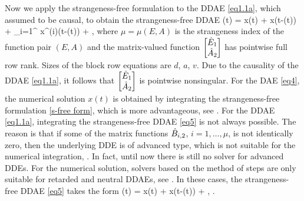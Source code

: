 \documentclass[final,reqno]{siamltex}
\begin{document}
Now we apply the strangeness-free formulation to the DDAE \eqref{eq1.1a}, which assumed to be causal, to obtain the strangeness-free DDAE
%
\be\label{eq5}
  (t) \!=\!  x(t) \!+\!
  x(t-\vtau(t))
 \!+\!  \sum_{i=1}^{\mu}  x^{(i)}(t-\vtau(t))
 \!+\! , \quad {}
\ee
%
where $\mu=\mu(E,A)$ is the strangeness index of the function pair $(E,A)$ and the matrix-valued function $\begin{bmatrix} \hat{E}_1 \\ \hat{A}_2 \end{bmatrix}$ has pointwise full row rank.
Sizes of the block row equations are $d$, $a$, $v$. Due to the causality of the DDAE \eqref{eq1.1a}, it follows that $\begin{bmatrix} \hat{E}_1 \\ \hat{A}_2 \end{bmatrix}$ is pointwise 
nonsingular.
For the DAE \eqref{eq4}, the numerical solution $x(t)$ is obtained by integrating the strangeness-free formulation \eqref{s-free form}, which is more 
advantageous, see \cite{KunM96a,KunM96c,KunM06}.
For the DDAE \eqref{eq1.1a}, integrating the strangeness-free DDAE \eqref{eq5} is not always possible. The reason is that if 
some of the matrix functions $\hat{B}_{i,2}$, $i=1,\dots,\mu$, is not identically zero, then the underlying DDE 
is of advanced type, which is not suitable for the numerical integration, \cite{BelZ03}. In fact, until now there is still no solver for advanced DDEs. 
For the numerical solution, solvers based on the method of steps are only suitable for retarded and neutral DDAEs, see \cite{AscP95,GugH07,Hau97,HaM14}.
In these cases, the strangeness-free DDAE \eqref{eq5} takes the form
%
\be\label{eq6}
  (t) \!=\!  x(t) \!+\!
  x(t-\vtau(t)) \!+\! , \quad {}.
\end{document}
